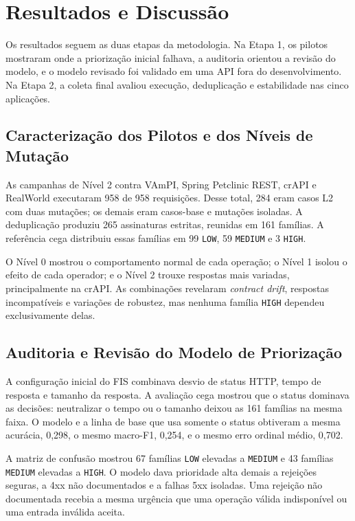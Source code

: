\section{Resultados e Discussão}\label{sec:resultados}

Os resultados seguem as duas etapas da metodologia. Na Etapa 1, os pilotos
mostraram onde a priorização inicial falhava, a auditoria orientou a revisão
do modelo, e o modelo revisado foi validado em uma API fora do
desenvolvimento. Na Etapa 2, a coleta final avaliou execução, deduplicação e
estabilidade nas cinco aplicações.

\subsection{Caracterização dos Pilotos e dos Níveis de Mutação}

As campanhas de Nível 2 contra VAmPI, Spring Petclinic REST, crAPI e RealWorld
executaram 958 de 958 requisições. Desse total, 284 eram casos L2 com duas
mutações; os demais eram casos-base e mutações isoladas. A deduplicação
produziu 265 assinaturas estritas, reunidas em 161 famílias. A referência cega
distribuiu essas famílias em 99 \texttt{LOW}, 59 \texttt{MEDIUM} e 3
\texttt{HIGH}.

O Nível 0 mostrou o comportamento normal de cada operação; o Nível 1 isolou o
efeito de cada operador; e o Nível 2 trouxe respostas mais variadas,
principalmente na crAPI. As combinações revelaram \textit{contract drift}, respostas
incompatíveis e variações de robustez, mas nenhuma família \texttt{HIGH}
dependeu exclusivamente delas.

\subsection{Auditoria e Revisão do Modelo de Priorização}
\label{sec:revisao-fis}

A configuração inicial do FIS combinava desvio de status HTTP, tempo de resposta
e tamanho da resposta. A avaliação cega mostrou que o status dominava as
decisões: neutralizar o tempo ou o tamanho deixou as 161 famílias na mesma
faixa. O modelo e a linha de base que usa somente o status obtiveram a
mesma acurácia, 0,298, o mesmo macro-F1, 0,254, e o mesmo erro ordinal médio,
0,702.

A matriz de confusão mostrou 67 famílias \texttt{LOW} elevadas a
\texttt{MEDIUM} e 43 famílias \texttt{MEDIUM} elevadas a \texttt{HIGH}. O
modelo dava prioridade alta demais a rejeições seguras, a 4xx não documentados
e a falhas 5xx isoladas. Uma rejeição não documentada recebia a mesma urgência
que uma operação válida indisponível ou uma entrada inválida aceita.

